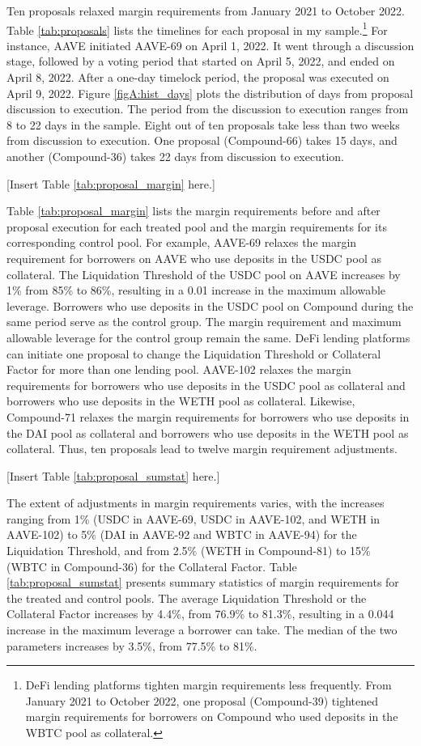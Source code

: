 \documentclass[12pt]{article}
\begin{document}
Ten proposals relaxed margin requirements from January 2021 to October 2022. Table \ref{tab:proposals} lists the timelines for each proposal in my sample.\footnote{DeFi lending platforms tighten margin requirements less frequently. From January 2021 to October 2022, one proposal (Compound-39) tightened margin requirements for borrowers on Compound who used deposits in the WBTC pool as collateral. } For instance, AAVE initiated AAVE-69 on April 1, 2022. It went through a discussion stage, followed by a voting period that started on April 5, 2022, and ended on April 8, 2022. After a one-day timelock period, the proposal was executed on April 9, 2022. Figure \ref{figA:hist_days} plots the distribution of days from proposal discussion to execution. The period from the discussion to execution ranges from 8 to 22 days in the sample. Eight out of ten proposals take less than two weeks from discussion to execution. One proposal (Compound-66) takes 15 days, and another (Compound-36) takes 22 days from discussion to execution.

\centerline{[Insert Table \ref{tab:proposal_margin} here.]}

 Table \ref{tab:proposal_margin} lists the margin requirements before and after proposal execution for each treated pool and the margin requirements for its corresponding control pool. For example, AAVE-69 relaxes the margin requirement for borrowers on AAVE who use deposits in the USDC pool as collateral. The Liquidation Threshold of the USDC pool on AAVE increases by 1\% from 85\% to 86\%, resulting in a 0.01 increase in the maximum allowable leverage. Borrowers who use deposits in the USDC pool on Compound during the same period serve as the control group. The margin requirement and maximum allowable leverage for the control group remain the same. DeFi lending platforms can initiate one proposal to change the Liquidation Threshold or Collateral Factor for more than one lending pool. AAVE-102 relaxes the margin requirements for borrowers who use deposits in the USDC pool as collateral and borrowers who use deposits in the WETH pool as collateral. Likewise, Compound-71 relaxes the margin requirements for borrowers who use deposits in the DAI pool as collateral and borrowers who use deposits in the WETH pool as collateral. Thus, ten proposals lead to twelve margin requirement adjustments.

 
 \centerline{[Insert Table \ref{tab:proposal_sumstat} here.]}


 The extent of adjustments in margin requirements varies, with the increases ranging from 1\% (USDC in AAVE-69, USDC in AAVE-102, and WETH in AAVE-102) to 5\% (DAI in AAVE-92 and WBTC in AAVE-94) for the Liquidation Threshold, and from 2.5\% (WETH in Compound-81) to 15\% (WBTC in Compound-36) for the Collateral Factor. Table \ref{tab:proposal_sumstat} presents summary statistics of margin requirements for the treated and control pools. The average Liquidation Threshold or the Collateral Factor increases by 4.4\%, from 76.9\% to 81.3\%, resulting in a 0.044 increase in the maximum leverage a borrower can take. The median of the two parameters increases by 3.5\%, from 77.5\% to 81\%.
\end{document}
